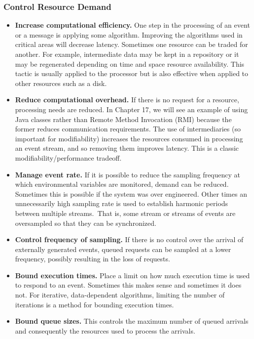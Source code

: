 \documentclass[a4paper]{article}
\begin{document}
\subsubsection{Control Resource Demand}
\begin{itemize}
  \item
    \textbf{Increase computational efficiency.}
    One step in the processing of an event or a message is applying some
    algorithm.
    Improving the algorithms used in critical areas will decrease latency.
    Sometimes one resource can be traded for another.
    For example, intermediate data may be kept in a
    repository or it may be regenerated depending on time and space resource
    availability.
    This tactic is usually applied to the processor but
    is also effective when applied to other resources such as a disk.
  \item
    \textbf{Reduce computational overhead.}
    If there is no request for a resource, processing needs are reduced.
    In Chapter 17, we will see an example of using Java classes rather than
    Remote Method Invocation (RMI) because the former reduces communication
    requirements.
    The use of intermediaries (so important for modifiability)
    increases the resources consumed in processing an event stream,
    and so removing them improves latency.
    This is a classic modifiability/performance tradeoff.
  \item
    \textbf{Manage event rate.}
    If it is possible to reduce the sampling
    frequency at which environmental variables are monitored,
    demand can be reduced. Sometimes this is possible if the system was
    over engineered.
    Other times an unnecessarily high sampling rate is used
    to establish harmonic periods between multiple streams.\
    That is, some stream or streams of events are oversampled so
    that they can be synchronized.
  \item
    \textbf{Control frequency of sampling.}
    If there is no control over the arrival of externally generated events,
    queued requests can be sampled at a lower frequency,
    possibly resulting in the loss of requests.
  \item
    \textbf{Bound execution times.}
    Place a limit on how much execution time is used to respond to an event.
    Sometimes this makes sense and sometimes it does not.
    For iterative, data-dependent algorithms,
    limiting the number of iterations is a method for bounding execution times.
  \item
    \textbf{Bound queue sizes.}
    This controls the maximum number of queued arrivals and
    consequently the resources used to process the arrivals.
\end{itemize}
\end{document}
